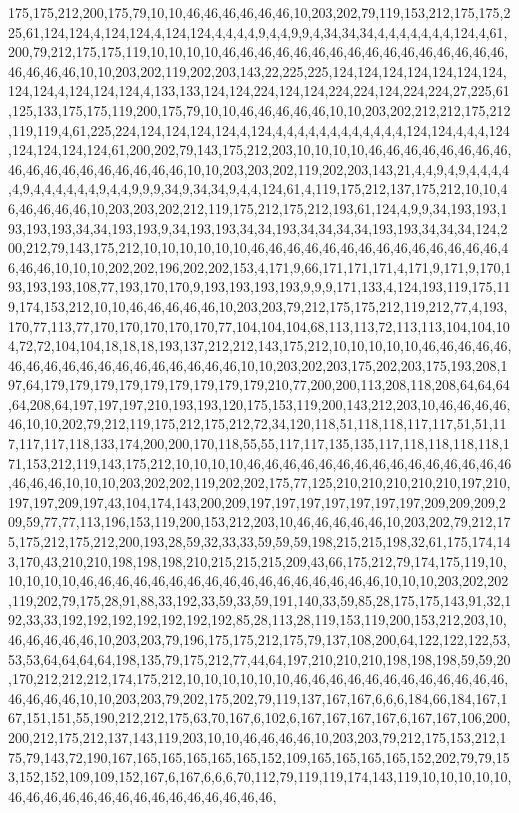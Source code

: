 175,175,212,200,175,79,10,10,46,46,46,46,46,46,10,203,202,79,119,153,212,175,175,225,61,124,124,4,124,124,4,124,124,4,4,4,4,9,4,4,9,9,4,34,34,34,4,4,4,4,4,4,4,124,4,61,200,79,212,175,175,119,10,10,10,10,46,46,46,46,46,46,46,46,46,46,46,46,46,46,46,46,46,46,46,46,10,10,203,202,119,202,203,143,22,225,225,124,124,124,124,124,124,124,124,124,4,124,124,124,4,133,133,124,124,224,124,124,224,224,124,224,224,27,225,61,125,133,175,175,119,200,175,79,10,10,46,46,46,46,46,10,10,203,202,212,212,175,212,119,119,4,61,225,224,124,124,124,124,4,124,4,4,4,4,4,4,4,4,4,4,4,4,124,124,4,4,4,124,124,124,124,124,61,200,202,79,143,175,212,203,10,10,10,10,46,46,46,46,46,46,46,46,46,46,46,46,46,46,46,46,46,46,10,10,203,203,202,119,202,203,143,21,4,4,9,4,9,4,4,4,4,4,9,4,4,4,4,4,4,9,4,4,9,9,9,34,9,34,34,9,4,4,124,61,4,119,175,212,137,175,212,10,10,46,46,46,46,46,10,203,203,202,212,119,175,212,175,212,193,61,124,4,9,9,34,193,193,193,193,193,34,34,193,193,9,34,193,193,34,34,193,34,34,34,34,193,193,34,34,34,124,200,212,79,143,175,212,10,10,10,10,10,10,46,46,46,46,46,46,46,46,46,46,46,46,46,46,46,46,46,10,10,10,202,202,196,202,202,153,4,171,9,66,171,171,171,4,171,9,171,9,170,193,193,193,108,77,193,170,170,9,193,193,193,193,9,9,9,171,133,4,124,193,119,175,119,174,153,212,10,10,46,46,46,46,46,10,203,203,79,212,175,175,212,119,212,77,4,193,170,77,113,77,170,170,170,170,170,77,104,104,104,68,113,113,72,113,113,104,104,104,72,72,104,104,18,18,18,193,137,212,212,143,175,212,10,10,10,10,10,46,46,46,46,46,46,46,46,46,46,46,46,46,46,46,46,46,46,10,10,203,202,203,175,202,203,175,193,208,197,64,179,179,179,179,179,179,179,179,179,210,77,200,200,113,208,118,208,64,64,64,64,208,64,197,197,197,210,193,193,120,175,153,119,200,143,212,203,10,46,46,46,46,46,10,10,202,79,212,119,175,212,175,212,72,34,120,118,51,118,118,117,117,51,51,117,117,117,118,133,174,200,200,170,118,55,55,117,117,135,135,117,118,118,118,118,171,153,212,119,143,175,212,10,10,10,10,46,46,46,46,46,46,46,46,46,46,46,46,46,46,46,46,46,46,10,10,10,203,202,202,119,202,202,175,77,125,210,210,210,210,210,197,210,197,197,209,197,43,104,174,143,200,209,197,197,197,197,197,197,197,209,209,209,209,59,77,77,113,196,153,119,200,153,212,203,10,46,46,46,46,46,10,203,202,79,212,175,175,212,175,212,200,193,28,59,32,33,33,59,59,59,198,215,215,198,32,61,175,174,143,170,43,210,210,198,198,198,210,215,215,215,209,43,66,175,212,79,174,175,119,10,10,10,10,10,46,46,46,46,46,46,46,46,46,46,46,46,46,46,46,46,46,10,10,10,203,202,202,119,202,79,175,28,91,88,33,192,33,59,33,59,191,140,33,59,85,28,175,175,143,91,32,192,33,33,192,192,192,192,192,192,192,85,28,113,28,119,153,119,200,153,212,203,10,46,46,46,46,46,10,203,203,79,196,175,175,212,175,79,137,108,200,64,122,122,122,53,53,53,64,64,64,64,198,135,79,175,212,77,44,64,197,210,210,210,198,198,198,59,59,20,170,212,212,212,174,175,212,10,10,10,10,10,10,46,46,46,46,46,46,46,46,46,46,46,46,46,46,46,46,10,10,203,203,79,202,175,202,79,119,137,167,167,6,6,6,184,66,184,167,167,151,151,55,190,212,212,175,63,70,167,6,102,6,167,167,167,167,6,167,167,106,200,200,212,175,212,137,143,119,203,10,10,46,46,46,46,10,203,203,79,212,175,153,212,175,79,143,72,190,167,165,165,165,165,165,152,109,165,165,165,165,152,202,79,79,153,152,152,109,109,152,167,6,167,6,6,6,70,112,79,119,119,174,143,119,10,10,10,10,10,46,46,46,46,46,46,46,46,46,46,46,46,46,46,46,